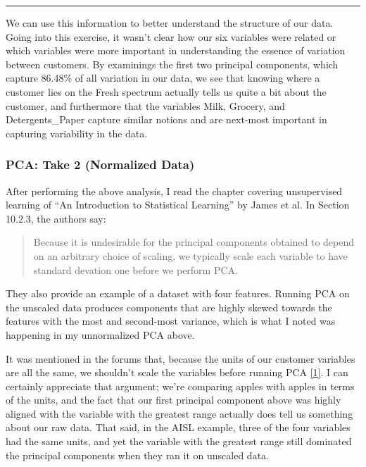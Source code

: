\documentclass{article}
\begin{document}
\begin{center}\rule{0.5\linewidth}{\linethickness}\end{center}

We can use this information to better understand the structure of our
data. Going into this exercise, it wasn't clear how our six variables
were related or which variables were more important in understanding the
essence of variation between customers. By examinings the first two
principal components, which capture 86.48\% of all variation in our
data, we see that knowing where a customer lies on the Fresh spectrum
actually tells us quite a bit about the customer, and furthermore that
the variables Milk, Grocery, and Detergents\_Paper capture similar
notions and are next-most important in capturing variability in the
data.

    \subsubsection{PCA: Take 2 (Normalized
Data)}\label{pca-take-2-normalized-data}

    After performing the above analysis, I read the chapter covering
unsupervised learning of ``An Introduction to Statistical Learning'' by
James et al. In Section 10.2.3, the authors say:

\begin{quote}
Because it is undesirable for the principal components obtained to
depend on an arbitrary choice of scaling, we typically scale each
variable to have standard devation one before we perform PCA.
\end{quote}

They also provide an example of a dataset with four features. Running
PCA on the unscaled data produces components that are highly skewed
towards the features with the most and second-most variance, which is
what I noted was happening in my unnormalized PCA above.

It was mentioned in the forums that, because the units of our customer
variables are all the same, we shouldn't scale the variables before
running PCA
\href{https://discussions.udacity.com/t/scaling-data-as-a-pre-step-of-pca/42091}{{[}1{]}}.
I can certainly appreciate that argument; we're comparing apples with
apples in terms of the units, and the fact that our first principal
component above was highly aligned with the variable with the greatest
range actually does tell us something about our raw data. That said, in
the AISL example, three of the four variables had the same units, and
yet the variable with the greatest range still dominated the principal
components when they ran it on unscaled data.
\end{document}
